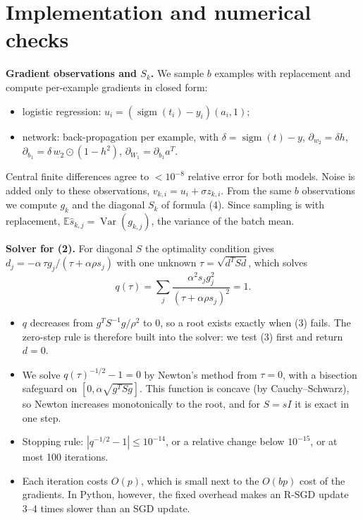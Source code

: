 \documentclass[11pt,a4paper]{article}
\newcommand{\E}{\mathbb{E}}
\DeclareMathOperator{\Var}{Var}
\DeclareMathOperator{\sigm}{sigm}
\begin{document}
\section{Implementation and numerical checks}

\textbf{Gradient observations and $S_k$.} We sample $b$ examples with replacement and compute
per-example gradients in closed form:
\begin{itemize}
\item logistic regression: $u_i=(\sigm(t_i)-y_i)(a_i,1)$;
\item network: back-propagation per example, with $\delta=\sigm(t)-y$, $\partial_{w_2}=\delta h$,
$\partial_{b_1}=\delta\,w_2\odot(1-h^2)$, $\partial_{W_1}=\partial_{b_1}a^T$.
\end{itemize}
Central finite differences agree to $<10^{-8}$ relative error for both models. Noise is added only to
these observations, $v_{k,i}=u_i+\sigma z_{k,i}$. From the same $b$ observations we compute $g_k$ and the
diagonal $S_k$ of formula (4). Since sampling is with replacement, $\E\widehat s_{k,j}=\Var(g_{k,j})$,
the variance of the batch mean.

\textbf{Solver for (2).} For diagonal $S$ the optimality condition gives
$d_j=-\alpha\,\tau g_j/(\tau+\alpha\rho s_j)$ with one unknown $\tau=\sqrt{d^TSd}$, which solves
\begin{equation*}
q(\tau)=\sum_j\frac{\alpha^2s_jg_j^2}{(\tau+\alpha\rho s_j)^2}=1 .
\end{equation*}
\begin{itemize}
\item $q$ decreases from $g^TS^{-1}g/\rho^2$ to $0$, so a root exists exactly when (3) fails. The
zero-step rule is therefore built into the solver: we test (3) first and return $d=0$.
\item We solve $q(\tau)^{-1/2}-1=0$ by Newton's method from $\tau=0$, with a bisection safeguard on
$[0,\alpha\sqrt{g^TSg}]$. This function is concave (by Cauchy--Schwarz), so Newton increases
monotonically to the root, and for $S=sI$ it is exact in one step.
\item Stopping rule: $|q^{-1/2}-1|\le10^{-14}$, or a relative change below $10^{-15}$, or at most 100
iterations.
\item Each iteration costs $O(p)$, which is small next to the $O(bp)$ cost of the gradients. In Python,
however, the fixed overhead makes an R-SGD update 3--4 times slower than an SGD update.
\end{itemize}
\end{document}
